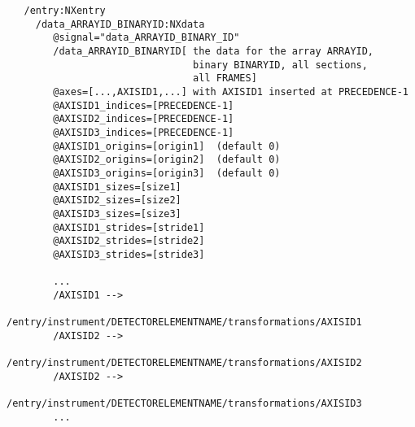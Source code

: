 \documentclass[11pt]{article}
\begin{document}
{\begin{verbatim}
   /entry:NXentry
     /data_ARRAYID_BINARYID:NXdata
        @signal="data_ARRAYID_BINARY_ID"
        /data_ARRAYID_BINARYID[ the data for the array ARRAYID,
                                binary BINARYID, all sections,
                                all FRAMES]
        @axes=[...,AXISID1,...] with AXISID1 inserted at PRECEDENCE-1
        @AXISID1_indices=[PRECEDENCE-1]
        @AXISID2_indices=[PRECEDENCE-1]
        @AXISID3_indices=[PRECEDENCE-1]
        @AXISID1_origins=[origin1]  (default 0)
        @AXISID2_origins=[origin2]  (default 0)
        @AXISID3_origins=[origin3]  (default 0)
        @AXISID1_sizes=[size1]
        @AXISID2_sizes=[size2]
        @AXISID3_sizes=[size3]
        @AXISID1_strides=[stride1]
        @AXISID2_strides=[stride2]
        @AXISID3_strides=[stride3]

        ...
        /AXISID1 -->
            /entry/instrument/DETECTORELEMENTNAME/transformations/AXISID1
        /AXISID2 -->
            /entry/instrument/DETECTORELEMENTNAME/transformations/AXISID2
        /AXISID2 -->
            /entry/instrument/DETECTORELEMENTNAME/transformations/AXISID3
        ...


\end{verbatim}}
\end{document}
